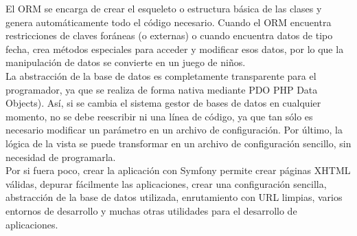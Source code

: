 El ORM se encarga de crear el esqueleto o estructura básica de las clases y genera automáticamente todo el código necesario. Cuando el ORM encuentra restricciones de claves foráneas (o externas) o cuando encuentra datos de tipo fecha, crea métodos especiales para acceder y modificar esos datos, por lo que la manipulación de datos se convierte en un juego de niños.\\

La abstracción de la base de datos es completamente transparente para el programador, ya que se realiza de forma nativa mediante PDO PHP Data Objects). Así, si se cambia el sistema gestor de bases de datos en cualquier momento, no se debe reescribir ni una línea de código, ya que tan sólo es necesario modificar un parámetro en un archivo de configuración. 
Por último, la lógica de la vista se puede transformar en un archivo de configuración sencillo, sin necesidad de programarla.\\
Por si fuera poco, crear la aplicación con Symfony permite crear páginas XHTML válidas, depurar fácilmente las aplicaciones, crear una configuración sencilla, abstracción de la base de datos utilizada, enrutamiento con URL limpias, varios entornos de desarrollo y muchas otras utilidades para el desarrollo de aplicaciones. 